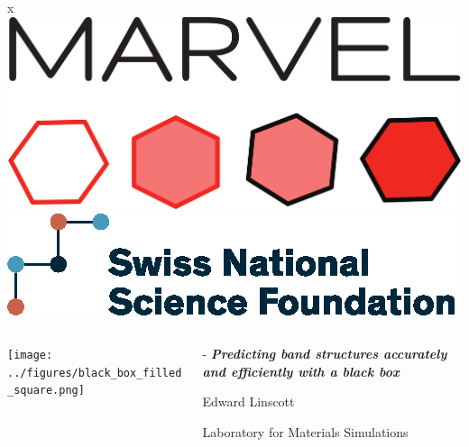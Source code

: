 \documentclass[xcolor=table,aspectratio=169]{beamer}
\begin{document}
\begin{frame}{x}
  \raggedleft
      \includegraphics[height=0.05\paperheight]{../figures/logo_marvel_color_transparent.png}
      \hspace{0.001\paperheight}
      \includegraphics[height=0.05\paperheight]{../figures/SNF_logo_standard_print_color_pos_e.eps}
  \vspace{-0.068\paperheight}
  \begin{columns}
    \begin{column}{\paperheight}
      \texttt{[image: ../figures/black\_box\_filled\_square.png]}
    \end{column}
    \begin{column}{\dimexpr\paperwidth-\paperheight}
      \vfill
      \bf
      \Large
      \emph{Predicting band structures accurately and efficiently with a black box}

      \vspace{0.5em}
      \normalsize
      Edward Linscott
      
      \footnotesize
      Laboratory for Materials Simulations
      \vfill
    \end{column}
  \end{columns}
\end{frame}
\end{document}
